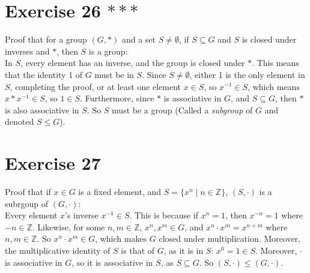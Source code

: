 \documentclass[12pt]{article}
\newcommand{\Z}{\mathbb{Z}}
\begin{document}
    \section*{Exercise 26 $***$}
    Proof that for a group $(G, \ast)$ and a set $S \neq \emptyset$,
    if $S \subseteq G$ and $S$ is closed under inverses and $\ast$,
    then $S$ is a group: \\
    In $S$, every element has an inverse,
    and the group is closed under $\ast$.
    This means that the identity 1 of $G$ must be in $S$.
    Since $S \neq \emptyset$,
    either 1 is the only element in $S$, completing the proof,
    or at least one element $x \in S$,
    so $x^{-1} \in S$,
    which means $x \ast x^{-1} \in S$,
    so $1 \in S$.
    Furthermore, since $\ast$ is associative in $G$,
    and $S \subseteq G$,
    then $\ast$ is also associative in $S$.
    So $S$ must be a group
    (Called a \textit{subgroup} of $G$ and denoted $S \leqslant G$).


    \section*{Exercise 27}
    Proof that if $x \in G$ is a fixed element,
    and $S = \{x^n \mid n \in \Z\}$,
    $(S, \cdot)$ is a subrgoup of $(G, \cdot)$: \\
    Every element $x$'s inverse $x^{-1} \in S$.
    This is because if $x^n = 1$,
    then $x^{-n} = 1$ where $-n \in \Z$.
    Likewise, for some $n, m \in \Z$, $x^n, x^m \in G$,
    and $x^n \cdot x^m = x^{n+m}$ where $n, m \in \Z$.
    So $x^n \cdot x^m \in G$, which makes $G$ closed under multiplication. 
    Moreover, the multiplicative identity of $S$ is that of $G$,
    as it is in $S$: $x^0 = 1 \in S$.
    Moreover, $\cdot$ is associative in $G$,
    so it is associative in $S$, as $S \subseteq G$.
    So $(S, \cdot) \leqslant (G, \cdot)$.
\end{document}
